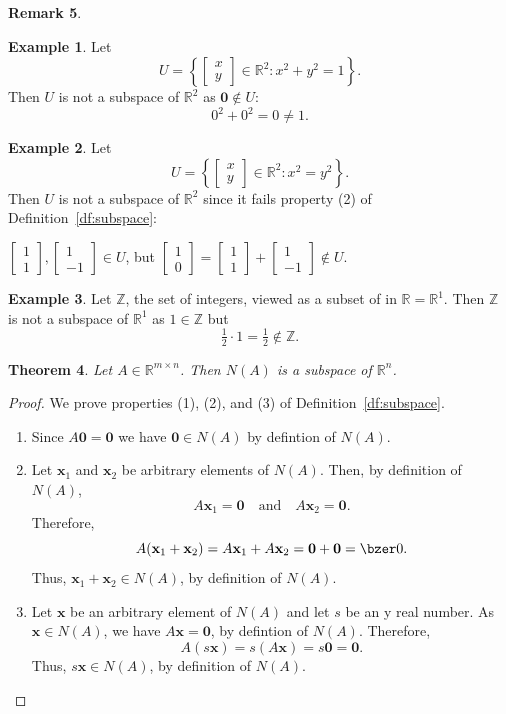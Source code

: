 \documentclass[12pt]{amsart}
\newcommand{\RR}{\mathbb{R}}
\newcommand{\ZZ}{\mathbb{Z}}
\newtheorem{theorem}{Theorem}[section]
\theoremstyle{definition} \newtheorem{definition}[theorem]{Definition}
\newtheorem{remark}[theorem]{Remark} \newtheorem{remarks}[theorem]{Remarks}
\newtheorem{example}[theorem]{Example}
\newcommand{\bx}{\mathbf{x}}
\newcommand{\bzero}{\mathbf{0}}
\newcommand{\mat}[1]{\begin{bmatrix}#1\end{bmatrix}}
\begin{document}
\begin{remark}
\begin{example}
  Let
  \[
    U = \left\{\mat{x\\y}\in\RR^2 : x^2 + y^2 = 1\right\}.
  \]
  Then $U$ is not a subspace of $\RR^2$ as $\bzero\notin U$:
  \[
    0^2 + 0^2 = 0 \neq 1.
  \]
\end{example}

\begin{example}
  Let
  \[
    U = \left\{\mat{x\\y}\in\RR^2 : x^2 = y^2\right\}.
  \]
  Then $U$ is not a subspace of $\RR^2$ since it fails property (2) of Definition~\ref{df:subspace}:
  \begin{center}
    $\mat{1\\1}, \mat{1\\-1}\in U$,
    but $\mat{1\\0}=\mat{1\\1} + \mat{1\\-1}\notin U$.
  \end{center}
\end{example}

\begin{example}
  Let $\ZZ$, the set of integers, viewed as a subset of in $\RR=\RR^1$.
  Then $\ZZ$ is not a subspace of $\RR^1$ as $1\in \ZZ$ but
  \[
    \tfrac12\cdot 1 = \tfrac12\notin \ZZ.
  \]
\end{example}

\begin{theorem}\label{th:nullspace_is_subspace}
  Let $A\in\RR^{m\times n}$. Then $N(A)$ is a subspace of $\RR^n$.
\end{theorem}

\begin{proof} We prove properties (1), (2), and (3) of Definition~\ref{df:subspace}.
  \begin{enumerate}
    \item Since $A\bzero=\bzero$ we have $\bzero\in N(A)$ by defintion of $N(A)$.
    \item Let $\bx_1$ and $\bx_2$ be arbitrary elements of $N(A)$. Then, by definition of $N(A)$,
      \[
        A\bx_1=\bzero\quad\text{and}\quad A\bx_2=\bzero.
      \]
      Therefore,
      \[
        A(\bx_1+\bx_2) = A\bx_1 + A\bx_2 = \bzero + \bzero = \bzer0.
      \]
      Thus, $\bx_1+\bx_2\in N(A)$, by definition of $N(A)$.
    \item Let $\bx$ be an arbitrary element of $N(A)$ and let $s$ be an y real number.
      As $\bx\in N(A)$, we have $A\bx=\bzero$, by defintion of $N(A)$.
      Therefore,
      \[
        A(s\bx) = s(A\bx) = s\bzero = \bzero.
      \]
      Thus, $s\bx\in N(A)$, by definition of $N(A)$.\qedhere
  \end{enumerate}
\end{proof}


\end{remark}
\end{document}
